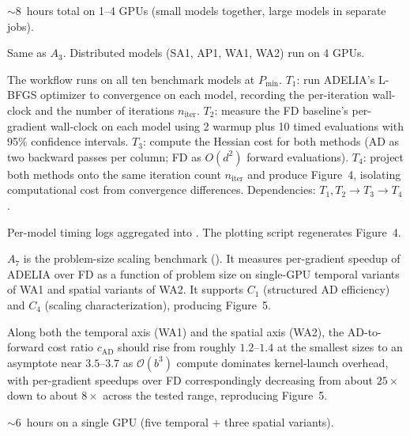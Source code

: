 \documentclass[nonacm,sigconf]{acmart}
\begin{document}
\arttime

$\sim$8~hours total on 1--4 GPUs (small models together,
large models in separate jobs).

\artin


Same as $A_3$. Distributed models (SA1, AP1, WA1, WA2) run on
4 GPUs.

\artcomp

The workflow runs on all ten benchmark models at $P_{\min}$.
$T_1$: run ADELIA's L-BFGS optimizer to convergence on each
model, recording the per-iteration wall-clock and the number
of iterations $n_{\mathrm{iter}}$.
$T_2$: measure the FD baseline's per-gradient wall-clock on
each model using 2 warmup plus 10 timed evaluations with
95\% confidence intervals.
$T_3$: compute the Hessian cost for both methods (AD as two
backward passes per column; FD as $O(d^2)$ forward evaluations).
$T_4$: project both methods onto the same iteration count
$n_{\mathrm{iter}}$ and produce Figure~4, isolating
computational cost from convergence differences.
Dependencies: $T_1, T_2 \rightarrow T_3 \rightarrow T_4$.

\artout

Per-model timing logs aggregated into
. The plotting script
regenerates Figure~4.


\newartifact

\artrel

$A_7$ is the problem-size scaling benchmark
(). It measures per-gradient
speedup of ADELIA over FD as a function of problem size on
single-GPU temporal variants of WA1 and spatial variants of WA2.
It supports $C_1$ (structured AD efficiency) and $C_4$ (scaling
characterization), producing Figure~5.

\artexp

Along both the temporal axis (WA1) and the spatial axis (WA2),
the AD-to-forward cost ratio $c_{\mathrm{AD}}$ should rise from
roughly $1.2$--$1.4$ at the smallest sizes to an asymptote near
$3.5$--$3.7$ as $\mathcal{O}(b^3)$ compute dominates
kernel-launch overhead, with per-gradient speedups over FD
correspondingly decreasing from about $25\times$ down to about
$8\times$ across the tested range, reproducing Figure~5.

\arttime

$\sim$6~hours on a single GPU (five temporal + three spatial
variants).
\end{document}
